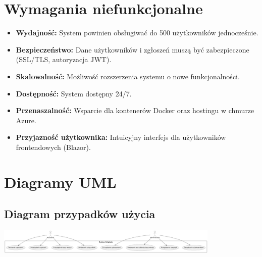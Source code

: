 \documentclass[a4paper,12pt]{article}
\begin{document}
\newpage

\section{Wymagania niefunkcjonalne}
\begin{itemize}
    \item \textbf{Wydajność:} System powinien obsługiwać do 500 użytkowników jednocześnie.
    \item \textbf{Bezpieczeństwo:} Dane użytkowników i zgłoszeń muszą być zabezpieczone (SSL/TLS, autoryzacja JWT).
    \item \textbf{Skalowalność:} Możliwość rozszerzenia systemu o nowe funkcjonalności.
    \item \textbf{Dostępność:} System dostępny 24/7.
    \item \textbf{Przenaszalność:} Wsparcie dla kontenerów Docker oraz hostingu w chmurze Azure.
    \item \textbf{Przyjazność użytkownika:} Intuicyjny interfejs dla użytkowników frontendowych (Blazor).
\end{itemize}

\newpage

\section{Diagramy UML}

\subsection{Diagram przypadków użycia}
\begin{center}
\includegraphics[width=0.8\textwidth]{draw/diagramPU.png}
\end{center}
\end{document}
